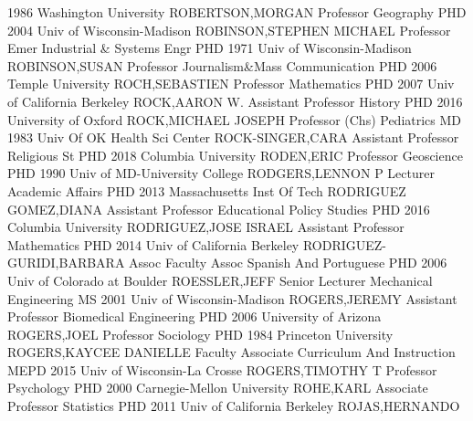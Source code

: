 \documentclass[
]{article}
\begin{document}
1986 Washington University \textbar ROBERTSON,MORGAN \textbar Professor
\textbar{}  \textbar Geography \textbar PHD 2004 Univ of
Wisconsin-Madison \textbar ROBINSON,STEPHEN MICHAEL \textbar Professor
Emer \textbar{}  \textbar Industrial \& Systems Engr
\textbar PHD 1971 Univ of Wisconsin-Madison \textbar ROBINSON,SUSAN
\textbar Professor \textbar{}  \textbar Journalism\&Mass
Communication \textbar PHD 2006 Temple University
\textbar ROCH,SEBASTIEN \textbar Professor \textbar{} 
\textbar Mathematics \textbar PHD 2007 Univ of California Berkeley
\textbar ROCK,AARON W. \textbar Assistant Professor \textbar{}
 \textbar History \textbar PHD 2016 University of Oxford
\textbar ROCK,MICHAEL JOSEPH \textbar Professor (Chs) \textbar{}
 \textbar Pediatrics \textbar MD 1983 Univ Of OK Health Sci
Center \textbar ROCK-SINGER,CARA \textbar Assistant Professor \textbar{}
 \textbar Religious St \textbar PHD 2018 Columbia University
\textbar RODEN,ERIC \textbar Professor \textbar{} 
\textbar Geoscience \textbar PHD 1990 Univ of MD-University College
\textbar RODGERS,LENNON P \textbar Lecturer \textbar{} 
\textbar Academic Affairs \textbar PHD 2013 Massachusetts Inst Of Tech
\textbar RODRIGUEZ GOMEZ,DIANA \textbar Assistant Professor \textbar{}
 \textbar Educational Policy Studies \textbar PHD 2016
Columbia University \textbar RODRIGUEZ,JOSE ISRAEL \textbar Assistant
Professor \textbar{}  \textbar Mathematics \textbar PHD 2014
Univ of California Berkeley \textbar RODRIGUEZ-GURIDI,BARBARA
\textbar Assoc Faculty Assoc \textbar{}  \textbar Spanish
And Portuguese \textbar PHD 2006 Univ of Colorado at Boulder
\textbar ROESSLER,JEFF \textbar Senior Lecturer \textbar{} 
\textbar Mechanical Engineering \textbar MS 2001 Univ of
Wisconsin-Madison \textbar ROGERS,JEREMY \textbar Assistant Professor
\textbar{}  \textbar Biomedical Engineering \textbar PHD
2006 University of Arizona \textbar ROGERS,JOEL \textbar Professor
\textbar{}  \textbar Sociology \textbar PHD 1984 Princeton
University \textbar ROGERS,KAYCEE DANIELLE \textbar Faculty Associate
\textbar{}  \textbar Curriculum And Instruction
\textbar MEPD 2015 Univ of Wisconsin-La Crosse \textbar ROGERS,TIMOTHY T
\textbar Professor \textbar{}  \textbar Psychology
\textbar PHD 2000 Carnegie-Mellon University \textbar ROHE,KARL
\textbar Associate Professor \textbar{}  \textbar Statistics
\textbar PHD 2011 Univ of California Berkeley \textbar ROJAS,HERNANDO
\end{document}
